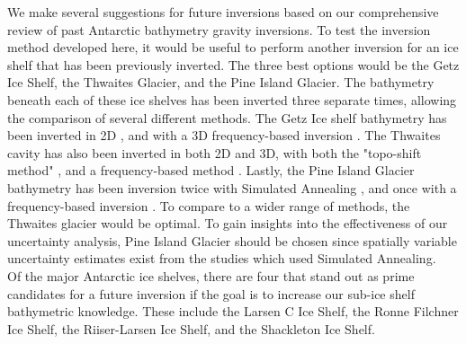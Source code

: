 We make several suggestions for future inversions based on our comprehensive review of past Antarctic bathymetry gravity inversions. To test the inversion method developed here, it would be useful to perform another  inversion for an ice shelf that has been previously inverted. The three best options would be the Getz Ice Shelf, the Thwaites Glacier, and the Pine Island Glacier. The bathymetry beneath each of these ice shelves has been inverted three separate times, allowing the comparison of several different methods. The Getz Ice shelf bathymetry has been inverted in 2D \citep{weigetz2020, cochrandetailed2020}, and with a 3D frequency-based inversion \citep{millanconstraining2020}. The Thwaites cavity has also been inverted in both 2D \citep{tintoprogressive2011} and 3D, with both the "topo-shift method" \citep{jordangeological2020}, and a frequency-based method \citep{millanbathymetry2017}. Lastly, the Pine Island Glacier bathymetry has been inversion twice with Simulated Annealing \citep{mutosubglacial2016, mutosubglacial2013}, and once with a frequency-based inversion \citep{millanbathymetry2017}. To compare to a wider range of methods, the Thwaites glacier would be optimal. To gain insights into the effectiveness of our uncertainty analysis, Pine Island Glacier should be chosen since spatially variable uncertainty estimates exist from the studies which used Simulated Annealing. \\

Of the major Antarctic ice shelves, there are four that stand out as prime candidates for a future inversion if the goal is to increase our sub-ice shelf bathymetric knowledge. These include the Larsen C Ice Shelf, the Ronne Filchner Ice Shelf, the Riiser-Larsen Ice Shelf, and the Shackleton Ice Shelf.

